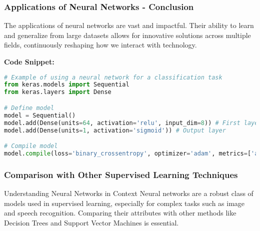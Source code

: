\documentclass[aspectratio=169]{beamer}
\begin{document}
\begin{frame}[fragile]
  \frametitle{Applications of Neural Networks - Conclusion}
  The applications of neural networks are vast and impactful. Their ability to learn and generalize from large datasets allows for innovative solutions across multiple fields, continuously reshaping how we interact with technology.

  \textbf{Code Snippet:}
  \begin{lstlisting}[language=Python]
# Example of using a neural network for a classification task
from keras.models import Sequential
from keras.layers import Dense

# Define model
model = Sequential()
model.add(Dense(units=64, activation='relu', input_dim=8)) # First layer
model.add(Dense(units=1, activation='sigmoid')) # Output layer

# Compile model
model.compile(loss='binary_crossentropy', optimizer='adam', metrics=['accuracy'])
  \end{lstlisting}
\end{frame}

\begin{frame}[fragile]
    \frametitle{Comparison with Other Supervised Learning Techniques}
    \begin{block}{Understanding Neural Networks in Context}
        Neural networks are a robust class of models used in supervised learning, especially for complex tasks such as image and speech recognition. Comparing their attributes with other methods like Decision Trees and Support Vector Machines is essential.
    \end{block}
\end{frame}
\end{document}
